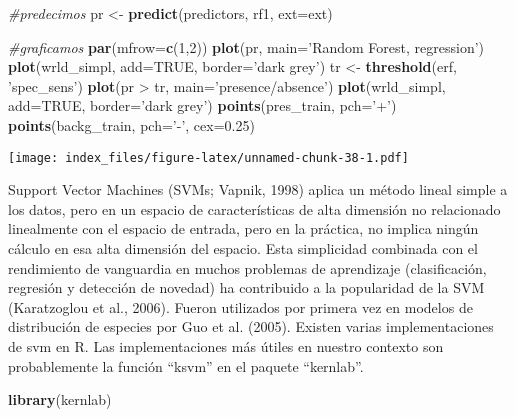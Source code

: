 \documentclass[]{article}
\newenvironment{Shaded}{\begin{snugshade}}{\end{snugshade}}
\newcommand{\KeywordTok}[1]{\textcolor[rgb]{0.13,0.29,0.53}{\textbf{{#1}}}}
\newcommand{\DataTypeTok}[1]{\textcolor[rgb]{0.13,0.29,0.53}{{#1}}}
\newcommand{\DecValTok}[1]{\textcolor[rgb]{0.00,0.00,0.81}{{#1}}}
\newcommand{\FloatTok}[1]{\textcolor[rgb]{0.00,0.00,0.81}{{#1}}}
\newcommand{\StringTok}[1]{\textcolor[rgb]{0.31,0.60,0.02}{{#1}}}
\newcommand{\CommentTok}[1]{\textcolor[rgb]{0.56,0.35,0.01}{\textit{{#1}}}}
\newcommand{\OtherTok}[1]{\textcolor[rgb]{0.56,0.35,0.01}{{#1}}}
\newcommand{\NormalTok}[1]{{#1}}
\begin{document}
\begin{Shaded}
\begin{Highlighting}[]
\CommentTok{#predecimos}
\NormalTok{pr <-}\StringTok{ }\KeywordTok{predict}\NormalTok{(predictors, rf1, }\DataTypeTok{ext=}\NormalTok{ext)}

\CommentTok{#graficamos}
\KeywordTok{par}\NormalTok{(}\DataTypeTok{mfrow=}\KeywordTok{c}\NormalTok{(}\DecValTok{1}\NormalTok{,}\DecValTok{2}\NormalTok{))}
\KeywordTok{plot}\NormalTok{(pr, }\DataTypeTok{main=}\StringTok{'Random Forest, regression'}\NormalTok{)}
\KeywordTok{plot}\NormalTok{(wrld_simpl, }\DataTypeTok{add=}\OtherTok{TRUE}\NormalTok{, }\DataTypeTok{border=}\StringTok{'dark grey'}\NormalTok{)}
\NormalTok{tr <-}\StringTok{ }\KeywordTok{threshold}\NormalTok{(erf, }\StringTok{'spec_sens'}\NormalTok{)}
\KeywordTok{plot}\NormalTok{(pr >}\StringTok{ }\NormalTok{tr, }\DataTypeTok{main=}\StringTok{'presence/absence'}\NormalTok{)}
\KeywordTok{plot}\NormalTok{(wrld_simpl, }\DataTypeTok{add=}\OtherTok{TRUE}\NormalTok{, }\DataTypeTok{border=}\StringTok{'dark grey'}\NormalTok{)}
\KeywordTok{points}\NormalTok{(pres_train, }\DataTypeTok{pch=}\StringTok{'+'}\NormalTok{)}
\KeywordTok{points}\NormalTok{(backg_train, }\DataTypeTok{pch=}\StringTok{'-'}\NormalTok{, }\DataTypeTok{cex=}\FloatTok{0.25}\NormalTok{)}
\end{Highlighting}
\end{Shaded}

\texttt{[image: index\_files/figure-latex/unnamed-chunk-38-1.pdf]}

Support Vector Machines (SVMs; Vapnik, 1998) aplica un método lineal
simple a los datos, pero en un espacio de características de alta
dimensión no relacionado linealmente con el espacio de entrada, pero en
la práctica, no implica ningún cálculo en esa alta dimensión del
espacio. Esta simplicidad combinada con el rendimiento de vanguardia en
muchos problemas de aprendizaje (clasificación, regresión y detección de
novedad) ha contribuido a la popularidad de la SVM (Karatzoglou et al.,
2006). Fueron utilizados por primera vez en modelos de distribución de
especies por Guo et al. (2005). Existen varias implementaciones de svm
en R. Las implementaciones más útiles en nuestro contexto son
probablemente la función ``ksvm'' en el paquete ``kernlab''.

\begin{Shaded}
\begin{Highlighting}[]
\KeywordTok{library}\NormalTok{(kernlab)}
\end{Highlighting}
\end{Shaded}
\end{document}
